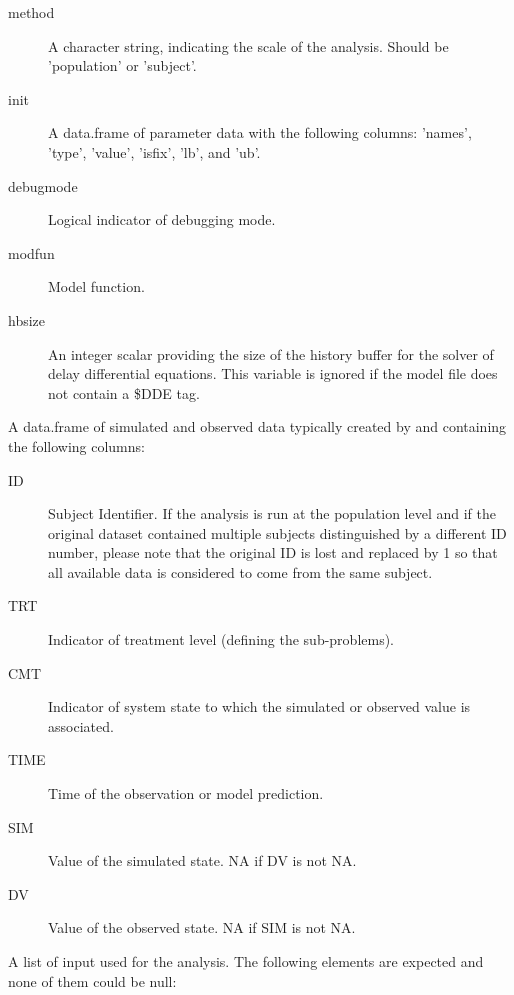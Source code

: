 \begin{Arguments}
\begin{ldescription}
\begin{description}
\item[method] A character string, indicating the scale of the analysis. Should
be 'population' or 'subject'.
\item[init] A data.frame of parameter data with the following columns:
'names', 'type', 'value', 'isfix', 'lb', and 'ub'.
\item[debugmode] Logical indicator of debugging mode.
\item[modfun] Model function.
\item[hbsize] An integer scalar providing the size of the history buffer for
the solver of delay differential equations. This variable is ignored if
the model file does not contain a \$DDE tag.

\end{description}


\item[\code{simdf}] A data.frame of simulated and observed data typically created
by  and containing the following columns: \begin{description}

\item[ID] Subject Identifier. If the analysis is run at the population level
and if the original dataset contained multiple subjects distinguished by
a different ID number, please note that the original ID is lost and 
replaced by 1 so that all available data is considered to come from the 
same subject.
\item[TRT] Indicator of treatment level (defining the sub-problems).
\item[CMT] Indicator of system state to which the simulated or observed 
value is associated.
\item[TIME] Time of the observation or model prediction.
\item[SIM] Value of the simulated state. NA if DV is not NA.
\item[DV] Value of the observed state. NA if SIM is not NA.

\end{description}


\item[\code{files}] A list of input used for the analysis. The following elements are
expected and none of them could be null: \begin{description}


\end{description}
\end{ldescription}
\end{Arguments}
